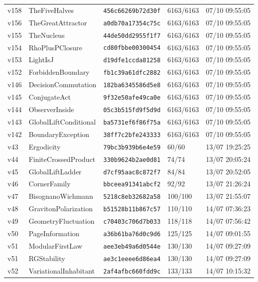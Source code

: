 \documentclass[11pt]{article}
\theoremstyle{definition}\newtheorem{deriv}{Derivação}
\begin{document}
{\begin{longtable}{@{}lllll@{}}
v158 & TheFiveHalves & \texttt{456c66269b72d30f} & 6163/6163 & 07/10 09:55:05 \\
v156 & TheGreatAttractor & \texttt{a0db70a17354c75c} & 6163/6163 & 07/10 09:55:05 \\
v155 & TheNucleus & \texttt{44de50dd2955f1f7} & 6163/6163 & 07/10 09:55:05 \\
v154 & RhoPlusPClosure & \texttt{cd80fbbe00300454} & 6163/6163 & 07/10 09:55:05 \\
v153 & LightIsJ & \texttt{d19dfe1ccda81258} & 6163/6163 & 07/10 09:55:05 \\
v152 & ForbiddenBoundary & \texttt{fb1c39a61dfc2882} & 6163/6163 & 07/10 09:55:05 \\
v146 & DecisionCommutation & \texttt{182ba6345586d5e8} & 6163/6163 & 07/10 09:55:05 \\
v145 & ConjugateAct & \texttt{9f32e50afe49ca0e} & 6163/6163 & 07/10 09:55:05 \\
v144 & ObserverInside & \texttt{05c3b515fd9f5d9d} & 6163/6163 & 07/10 09:55:05 \\
v143 & GlobalLiftConditional & \texttt{ba5731ef6f86f75a} & 6163/6163 & 07/10 09:55:05 \\
v142 & BoundaryException & \texttt{38ff7c2bfe243333} & 6163/6163 & 07/10 09:55:05 \\
v43 & Ergodicity & \texttt{79bc3b939b6e4e59} & 60/60 & 13/07 19:25:25 \\
v44 & FiniteCrossedProduct & \texttt{330b9624b2ae0d81} & 74/74 & 13/07 20:05:24 \\
v45 & GlobalLiftLadder & \texttt{d7cf95aac8c872f7} & 84/84 & 13/07 20:52:05 \\
v46 & CornerFamily & \texttt{bbceea91341abcf2} & 92/92 & 13/07 21:26:24 \\
v47 & BisognanoWichmann & \texttt{5218c8eb32682a58} & 100/100 & 13/07 21:55:07 \\
v48 & GravitonPolarization & \texttt{b51528b11b867c57} & 110/110 & 14/07 07:36:23 \\
v49 & GeometryFluctuation & \texttt{c70403c706d7b033} & 118/118 & 14/07 07:56:42 \\
v50 & PageInformation & \texttt{a36b61ba76d0c9d6} & 125/125 & 14/07 09:01:55 \\
v51 & ModularFirstLaw & \texttt{aee3eb49a6d0544e} & 130/130 & 14/07 09:27:09 \\
v51 & RGStability & \texttt{ae3c1eeee6d86ea4} & 130/130 & 14/07 09:27:09 \\
v52 & VariationalInhabitant & \texttt{2af4afbc660fdd9c} & 133/133 & 14/07 10:15:32 \\

\end{longtable}}
\end{document}
